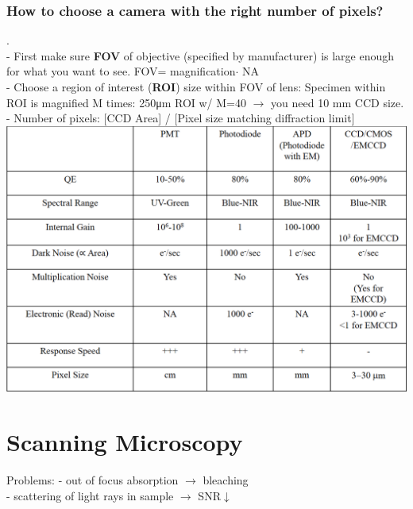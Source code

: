 \documentclass[9pt]{article}
\begin{document}
\begin{multicols}{2}
\subsubsection{How to choose a camera with the right number of pixels?}.\\
- First make sure \textbf{FOV} of objective (specified by manufacturer) is large enough for what you want to see. FOV= magnification$\cdot $ NA\\
- Choose a region of interest (\textbf{ROI}) size within FOV of lens: Specimen within ROI is magnified M times: 250\si{\micro\meter} ROI w/ M=40 $\rightarrow$ you need 10 mm CCD size.\\
- Number of pixels: [CCD Area] / [Pixel size matching diffraction limit]\\
\includegraphics[width = \linewidth]{Images/comparison_detectors.png}
\\



\section{Scanning Microscopy}
Problems: - out of focus absorption $\rightarrow$ bleaching \\
- scattering of light rays in sample $\rightarrow$ SNR$\downarrow$

\end{multicols}
\end{document}

